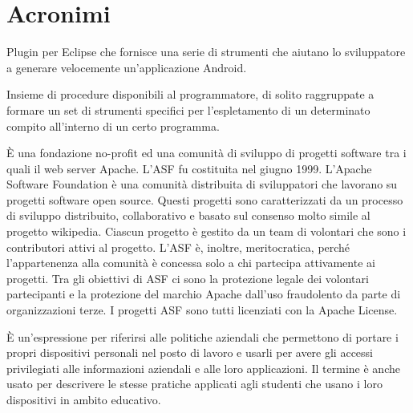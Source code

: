 {}
\section*{Acronimi}
\begin{acronym}[HTML5]
	
	{\small Plugin per Eclipse che fornisce una serie di strumenti che aiutano lo sviluppatore a generare velocemente un'applicazione Android. \par}
	
	
	{\small Insieme di procedure disponibili al programmatore, di solito raggruppate a formare un set di strumenti specifici per l'espletamento di un determinato compito all'interno di un certo programma. \par}
	
	
	{\small È una fondazione no-profit ed una comunità di sviluppo di progetti software tra i quali il web server Apache. L'ASF fu costituita nel giugno 1999. L'Apache Software Foundation è una comunità distribuita di sviluppatori che lavorano su progetti software open source. Questi progetti sono caratterizzati da un processo di sviluppo distribuito, collaborativo e basato sul consenso molto simile al progetto wikipedia. Ciascun progetto è gestito da un team di volontari che sono i contributori attivi al progetto. L'ASF è, inoltre, meritocratica, perché l'appartenenza alla comunità è concessa solo a chi partecipa attivamente ai progetti. Tra gli obiettivi di ASF ci sono la protezione legale dei volontari partecipanti e la protezione del marchio Apache dall'uso fraudolento da parte di organizzazioni terze. I progetti ASF sono tutti licenziati con la Apache License. \par}
	
	
	{\small È un'espressione per riferirsi alle politiche aziendali che permettono di portare i propri dispositivi personali nel posto di lavoro e usarli per avere gli accessi privilegiati alle informazioni aziendali e alle loro applicazioni. Il termine è anche usato per descrivere le stesse pratiche applicati agli studenti che usano i loro dispositivi in ambito educativo. \par}


\end{acronym}
